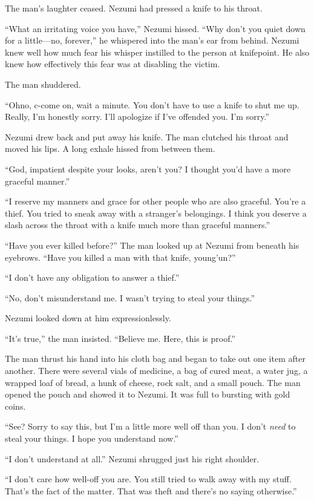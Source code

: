 The man's laughter ceased. Nezumi had pressed a knife to his throat.

``What an irritating voice you have,'' Nezumi hissed. ``Why don't you
quiet down for a little---no, forever,'' he whispered into the man's ear
from behind. Nezumi knew well how much fear his whisper instilled to the
person at knifepoint. He also knew how effectively this fear was at
disabling the victim.

The man shuddered.

``Oh\el no, c-come on, wait a minute. You don't have to use a knife to
shut me up. Really, I'm honestly sorry. I'll apologize if I've offended
you. I'm sorry.''

Nezumi drew back and put away his knife. The man clutched his throat and
moved his lips. A long exhale hissed from between them.

``God, impatient despite your looks, aren't you? I thought you'd have a
more graceful manner.''

``I reserve my manners and grace for other people who are also graceful.
You're a thief. You tried to sneak away with a stranger's belongings. I
think you deserve a slash across the throat with a knife much more than
graceful manners.''

``Have you ever killed before?'' The man looked up at Nezumi from
beneath his eyebrows. ``Have you killed a man with that knife,
young'un?''

``I don't have any obligation to answer a thief.''

``No, don't misunderstand me. I wasn't trying to steal your things.''

Nezumi looked down at him expressionlessly.

``It's true,'' the man insisted. ``Believe me. Here, this is proof.''

The man thrust his hand into his cloth bag and began to take out one
item after another. There were several vials of medicine, a bag of cured
meat, a water jug, a wrapped loaf of bread, a hunk of cheese, rock salt,
and a small pouch. The man opened the pouch and showed it to Nezumi. It
was full to bursting with gold coins.

``See? Sorry to say this, but I'm a little more well off than you. I
don't \emph{need} to steal your things. I hope you understand now.''

``I don't understand at all.'' Nezumi shrugged just his right shoulder.

``I don't care how well-off you are. You still tried to walk away with
my stuff. That's the fact of the matter. That was theft and there's no
saying otherwise.''

